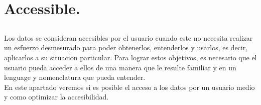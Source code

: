 \newpage
\section{Accessible.}
\subsection*{}
 
Los datos se consideran accesibles por el usuario cuando este no necesita realizar un esfuerzo desmesurado para
poder obtenerlos, entenderlos y usarlos, es decir, aplicarlos a su situacion particular. Para lograr estos objetivos,
es necesario que el usuario pueda acceder a ellos de una manera que le resulte familiar y en un lenguage y nomenclatura
que pueda entender.\\ 

En este apartado veremos si es posible el acceso a los datos por un usuario medio y como optimizar la accesibilidad.






\begin{figure}[ht]
  \centering
  \end{figure}



